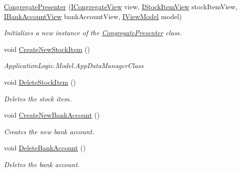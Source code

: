 \begin{DoxyCompactItemize}
\item 
\hyperlink{class_application_logic_1_1_presenter_1_1_congregate_presenter_a4599df5ec46ce56bc80c1ccf058cda5d}{CongregatePresenter} (\hyperlink{interface_application_logic_1_1_interfaces_1_1_i_congregate_view}{ICongregateView} view, \hyperlink{interface_application_logic_1_1_interfaces_1_1_i_stock_item_view}{IStockItemView} stockItemView, \hyperlink{interface_application_logic_1_1_interfaces_1_1_i_bank_account_view}{IBankAccountView} bankAccountView, \hyperlink{interface_application_logic_1_1_interfaces_1_1_i_view_model}{IViewModel} model)
\begin{DoxyCompactList}\small\item\em Initializes a new instance of the \hyperlink{class_application_logic_1_1_presenter_1_1_congregate_presenter}{CongregatePresenter} class. \item\end{DoxyCompactList}\item 
void \hyperlink{class_application_logic_1_1_presenter_1_1_congregate_presenter_a78dd23169c77d2b14d3bab837388a9ac}{CreateNewStockItem} ()
\begin{DoxyCompactList}\small\item\em ApplicationLogic.Model.AppDataManagerClass \item\end{DoxyCompactList}\item 
void \hyperlink{class_application_logic_1_1_presenter_1_1_congregate_presenter_afb7e0ccf364f29cf8062bac56efc8f2f}{DeleteStockItem} ()
\begin{DoxyCompactList}\small\item\em Deletes the stock item. \item\end{DoxyCompactList}\item 
void \hyperlink{class_application_logic_1_1_presenter_1_1_congregate_presenter_af591e9f32c6b55747ec0c1789ffe2fe6}{CreateNewBankAccount} ()
\begin{DoxyCompactList}\small\item\em Creates the new bank account. \item\end{DoxyCompactList}\item 
void \hyperlink{class_application_logic_1_1_presenter_1_1_congregate_presenter_a2407edbf6827238bfa5f706ed128f8ff}{DeleteBankAccount} ()
\begin{DoxyCompactList}\small\item\em Deletes the bank account. \item\end{DoxyCompactList}\item 

\end{DoxyCompactItemize}
